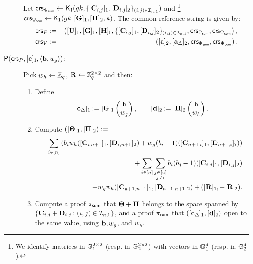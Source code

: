 \begin{description}
Let
$\mathsf{crs}_{\Psi_{\mathsf{sum}}} \gets \mathsf{K}_1({gk}, \{[\mathbf{{C}}_{i,j}]_1,[\mathbf{{D}}_{i,j}]_2\}_{(i,j)\in\mathcal{I}_{n,1}})$ and \footnote{We identify
matrices in $\mathbb{G}_1^{2 \times 2}$ (resp. in $\mathbb{G}_2^{2 \times 2}$) with vectors in $\mathbb{G}_1^{4}$ (resp. in $\mathbb{G}_2^{4}$).}  
 $\mathsf{crs}_{\Psi_{\mathsf{com}}} \gets \mathsf{K}_1({gk}, [\mathbf{{G}}]_1,[{\mathbf{{H}}}]_2,n)$. The common reference string is given by:
\begin{eqnarray*}
\mathsf{crs}_P&:=&\left( [\mathbf{{U}}]_1,  [\mathbf{{G}}]_1,
    [\mathbf{{H}}]_1, \{[\mathbf{{C}}_{i,j}]_1,[\mathbf{{D}}_{i,j}]_2 \}_{(i,j) \in \mathcal{I}_{n,1}},\mathsf{crs}_{\Psi_{\mathsf{sum}}},\mathsf{crs}_{\Psi_{\mathsf{com}}} \right), \\
\mathsf{crs}_V&:=&\left([\mathbf{a}]_2, [\mathbf{a}_\Delta]_2, \mathsf{crs}_{\Psi_{\mathsf{sum}}},\mathsf{crs}_{\Psi_{\mathsf{com}}} \right). 
 \end{eqnarray*}
\item[{$\mathsf{P}(\mathsf{crs}_P, [\mathbf{c}]_1, \langle \mathbf{b}, w_g \rangle)$:}]
Pick $w_h \gets \mathbb{Z}_q$,  $\mathbf{{R}} \gets \mathbb{Z}_q^{2\times 2}$ and then: 
\begin{enumerate}
\item Define 
$$[\mathbf{c}_{\Delta}]_1 := [\mathbf{{G}}]_1 \begin{pmatrix} \mathbf{b} \\ w_g \end{pmatrix},
\qquad [\mathbf{d}]_2 := [{\mathbf{{H}}}]_2 \begin{pmatrix} \mathbf{b} \\ w_h \end{pmatrix}.$$ 
\item Compute 
 $([\mathbf{{\Theta}}]_1, [\mathbf{{\Pi}}]_2) :=$
\begin{eqnarray} \label{eq:ThetaPi}
& &
    \sum_{i \in [n]}\left(
        b_i w_h ([\mathbf{{C}}_{i,n+1}]_1,[\mathbf{{D}}_{i,n+1}]_2)+
        w_g(b_i-1) ([\mathbf{{C}}_{n+1,i}]_1, [\mathbf{{D}}_{n+1,i}]_2)\right)
        \nonumber\\ & &           +
       \sum_{i \in [n]}  \sum_{\substack{j \in [n]\\ j\neq i}} b_i (b_j-1) ([\mathbf{{C}}_{i,j}]_1, [\mathbf{{D}}_{i,j}]_2)\nonumber\\
       & &
     +
    w_gw_h ([\mathbf{{C}}_{n+1,n+1}]_1, [\mathbf{{D}}_{n+1,n+1}]_2) +  ([\mathbf{{R}}]_1,-[\mathbf{{R}}]_2).
 \end{eqnarray}

\item Compute a proof $\pi_{\mathsf{sum}}$
that $\mathbf{{\Theta}}+\mathbf{{\Pi}}$
belongs to the space spanned by $\{\mathbf{{C}}_{i,j}+\mathbf{{D}}_{i,j}:(i,j)\in\mathcal{I}_{n,1}\}$,
 and a proof 
$\pi_{\mathsf{com}}$
that
$([\mathbf{c}_\Delta]_1,[\mathbf{d}]_2)$ open to the same value,
using $\mathbf{b},w_g$, and $w_h$. 
\end{enumerate}


\end{description}
